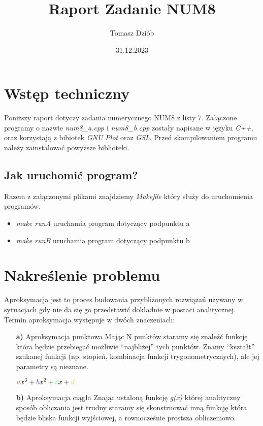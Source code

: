 \documentclass{article}
\title{Raport Zadanie NUM8}
\date{31.12.2023}
\author{Tomasz Dziób}
\begin{document}
  \maketitle
  \newpage
  \section{Wstęp techniczny}
  Poniższy raport dotyczy zadania numerycznego NUM8 z listy 7. Załączone programy o nazwie \textit{num8\_a.cpp} i \textit{num8\_b.cpp} zostały napisane w języku \textit{C++}, oraz korzystają z bibiotek \textit{GNU Plot} oraz \textit{GSL}. Przed skompilowaniem programu należy zainstalować powyższe biblioteki.

    \subsection{Jak uruchomić program?}
    Razem z załączonymi plikami znajdziemy \textit{Makefile} który służy do uruchomienia programów.
    \begin{itemize}
      \item \textit{make runA} uruchamia program dotyczący podpunktu a
      \item \textit{make runB} uruchamia program dotyczący podpunktu b
    \end{itemize}

  \section{Nakreślenie problemu}

  Aproksymacja jest to proces budowania przybliżonych rozwiązań używany w sytuacjach gdy nie da się go przedstawić dokładnie w postaci analitycznej. Termin aproksymacja występuje w dwóch znaczeniach:
  \begin{enumerate}
    \item[\bf{a)}] Aproksymacja punktowa
    Mając N punktów staramy się znaleźć funkcję która będzie przebiegać możliwie ``najbliżej'' tych punktów. Znamy ``kształt'' szukanej funkcji (np. stopień, kombinacja funkcji trygonometrycznych), ale jej parametry są nieznane.
    \begin{center}
      $\textcolor{red}{a}x^3+\textcolor{blue}{b}x^2+\textcolor{green}{c}x+\textcolor{yellow}{d}$
    \end{center}
    \item[\bf{b)}] Aproksymacja ciągła
    Znając ustaloną funkcję \textit{g(x)} której analityczny sposób obliczania jest trudny staramy się skonstruować inną funkcję która będzie bliska funkcji wyjściowej, a rownocześnie prostsza obliczeniowo.
  \end{enumerate}
\end{document}
